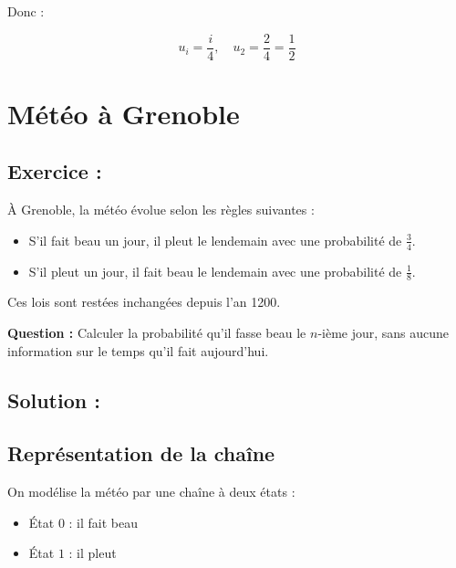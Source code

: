 Donc :

\[
u_i = \frac{i}{4} , \quad
\boxed{u_2 = \frac{2}{4} = \frac{1}{2}}
\]

\vspace{1cm}

\section{Météo à Grenoble}

\subsection*{Exercice :}

\begin{exerciseBox}
À Grenoble, la météo évolue selon les règles suivantes :
\begin{itemize}
  \item S’il fait beau un jour, il pleut le lendemain avec une probabilité de $\frac{3}{4}$.
  \item S’il pleut un jour, il fait beau le lendemain avec une probabilité de $\frac{1}{8}$.
\end{itemize}

Ces lois sont restées inchangées depuis l’an 1200.

\vspace{0.5em}
\textbf{Question :} Calculer la probabilité qu’il fasse beau le $n$-ième jour, sans aucune information sur le temps qu’il fait aujourd’hui.
\end{exerciseBox}

\subsection*{Solution :}


\subsection*{Représentation de la chaîne}

On modélise la météo par une chaîne à deux états :

\begin{itemize}
  \item État \( 0 \) : il fait beau
  \item État \( 1 \) : il pleut
\end{itemize}

\begin{center}
\end{center}

